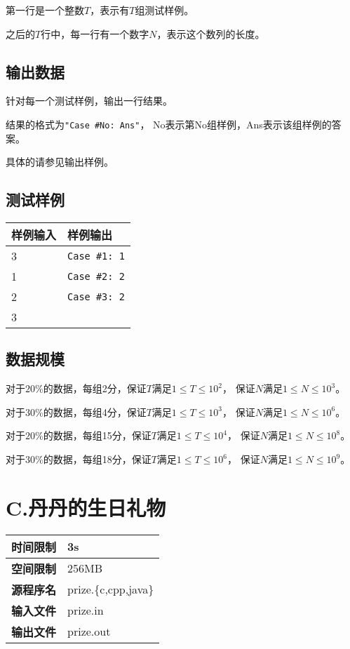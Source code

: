 \documentclass{article}
\begin{document}
第一行是一个整数$T$，表示有$T$组测试样例。

之后的$T$行中，每一行有一个数字$N$，表示这个数列的长度。

\subsection*{输出数据}
针对每一个测试样例，输出一行结果。

结果的格式为{\tt "Case \#No: Ans"}，
No表示第No组样例，Ans表示该组样例的答案。

具体的请参见输出样例。

\subsection*{测试样例}
\begin{flushleft}
\begin{tabular}{|p{6cm}|p{6cm}|}
 \hline \bfseries{样例输入} & \bfseries{样例输出} \\
 \hline 
    3 & {\tt Case \#1: 1} \\
    1 & {\tt Case \#2: 2} \\
    2 & {\tt Case \#3: 2} \\
    3 & \\
 \hline 
\end{tabular}
\end{flushleft}

\subsection*{数据规模}
对于$20\%$的数据，每组2分，保证$T$满足$1 \leq T \leq 10^{2}$，
保证$N$满足$1 \leq N \leq 10^{3}$。


对于$30\%$的数据，每组4分，保证$T$满足$1 \leq T \leq 10^{3}$，
保证$N$满足$1 \leq N \leq 10^{6}$。


对于$20\%$的数据，每组15分，保证$T$满足$1 \leq T \leq 10^{4}$，
保证$N$满足$1 \leq N \leq 10^{8}$。


对于$30\%$的数据，每组18分，保证$T$满足$1 \leq T \leq 10^{6}$，
保证$N$满足$1 \leq N \leq 10^{9}$。

\clearpage

\section*{C.丹丹的生日礼物}
\begin{longtable}{|c|l|}
 \hline \bfseries{时间限制} & 3s \\
 \hline \bfseries{空间限制} & 256MB \\
 \hline \bfseries{源程序名} & prize.\{c,cpp,java\} \\
 \hline \bfseries{输入文件} & prize.in \\
 \hline \bfseries{输出文件} & prize.out \\
 \hline 
\end{longtable}
\end{document}

